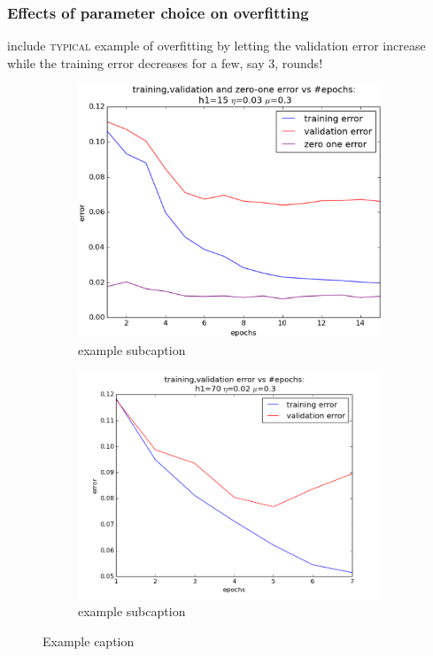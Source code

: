 \subsubsection{Effects of parameter choice on overfitting}
include \textsc{typical} example of overfitting by letting the validation error increase while the training error decreases for a few, say 3, rounds!
	\begin{figure}[!ht]
	\centering
	\begin{subfigure}[b]{.4\textwidth}
	\centering
	\includegraphics[width=\textwidth]{mlp/plots/15h1_no_overfit.eps}
	\caption{example subcaption}
	\end{subfigure}
	\quad
	\begin{subfigure}[b]{.4\textwidth}
	\centering
	\includegraphics[width=\textwidth]{mlp/plots/70h1_wishful_thinking.png}
	\caption{example subcaption}
	\end{subfigure}
	\caption{Example caption}
	\label{fig:overfiting}
	\end{figure}
